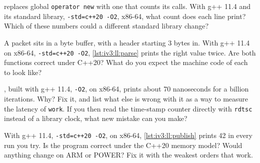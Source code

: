 \begin{question}\label{iq:iv3:low-latency:9}
 replaces global \texttt{operator new} with one that counts its calls. With g++ 11.4 and its standard library, \texttt{-std=c++20 -O2}, x86-64, what count does each line print? Which of these numbers could a different standard library change?
\label{lst:iv3:ll:countnew}
\end{question}

\begin{question}\label{iq:iv3:low-latency:10}
A packet sits in a byte buffer, with a header starting 3 bytes in. With g++ 11.4 on x86-64, \texttt{-std=c++20 -O2}, \cref{lst:iv3:ll:parse} prints the right value twice. Are both functions correct under C++20? What do you expect the machine code of each to look like?
\label{lst:iv3:ll:parse}
\end{question}

\begin{question}\label{iq:iv3:low-latency:11}
, built with g++ 11.4, \texttt{-O2}, on x86-64, prints about 70 nanoseconds for a billion iterations. Why? Fix it, and list what else is wrong with it as a way to measure the latency of \texttt{work}. If you then read the time-stamp counter directly with \texttt{rdtsc} instead of a library clock, what new mistake can you make?
\label{lst:iv3:ll:benchbad}
\end{question}

\begin{question}\label{iq:iv3:low-latency:12}
With g++ 11.4, \texttt{-std=c++20 -O2}, on x86-64, \cref{lst:iv3:ll:publish} prints 42 in every run you try. Is the program correct under the C++20 memory model? Would anything change on ARM or POWER? Fix it with the weakest orders that work.
\label{lst:iv3:ll:publish}
\end{question}

